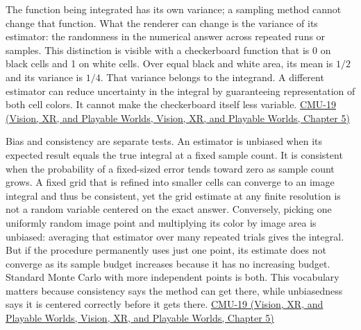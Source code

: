 The function being integrated has its own variance; a sampling method cannot change that function. What the renderer can change is the variance of its estimator: the randomness in the numerical answer across repeated runs or samples. This distinction is visible with a checkerboard function that is 0 on black cells and 1 on white cells. Over equal black and white area, its mean is \(1/2\) and its variance is \(1/4\). That variance belongs to the integrand. A different estimator can reduce uncertainty in the integral by guaranteeing representation of both cell colors. It cannot make the checkerboard itself less variable. \href{../07-Vision-XR-and-Playable-Worlds/main.pdf\#nameddest=04-visual-computing-ii-ch036-cmu-19---variance-reduction}{CMU-19 (Vision, XR, and Playable Worlds, Vision, XR, and Playable Worlds, Chapter 5)}

Bias and consistency are separate tests. An estimator is unbiased when its expected result equals the true integral at a fixed sample count. It is consistent when the probability of a fixed-sized error tends toward zero as sample count grows. A fixed grid that is refined into smaller cells can converge to an image integral and thus be consistent, yet the grid estimate at any finite resolution is not a random variable centered on the exact answer. Conversely, picking one uniformly random image point and multiplying its color by image area is unbiased: averaging that estimator over many repeated trials gives the integral. But if the procedure permanently uses just one point, its estimate does not converge as its sample budget increases because it has no increasing budget. Standard Monte Carlo with more independent points is both. This vocabulary matters because consistency says the method can get there, while unbiasedness says it is centered correctly before it gets there. \href{../07-Vision-XR-and-Playable-Worlds/main.pdf\#nameddest=04-visual-computing-ii-ch036-cmu-19---variance-reduction}{CMU-19 (Vision, XR, and Playable Worlds, Vision, XR, and Playable Worlds, Chapter 5)}

